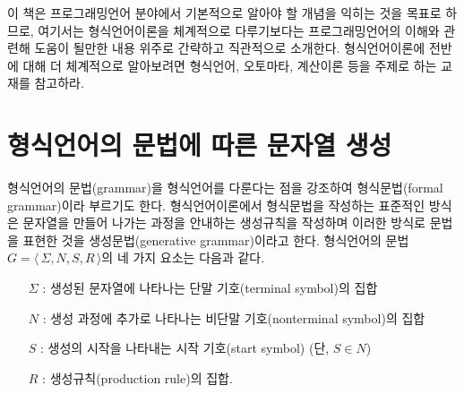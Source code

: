 이 책은 프로그래밍언어 분야에서 기본적으로 알아야 할 개념을 익히는
것을 목표로 하므로, 여기서는 형식언어이론을 체계적으로 다루기보다는
프로그래밍언어의 이해와 관련해 도움이 될만한 내용 위주로 간략하고 직관적으로 소개한다. 
형식언어이론에 전반에 대해 더 체계적으로 알아보려면 형식언어, 오토마타, 계산이론
등을 주제로 하는 교재\cite{Sipser2013,Hopcroft2007}를 참고하라.

\section{형식언어의 문법에 따른 문자열 생성}
\label{sec:GenGrammar}
%
%
%
%
형식언어의 문법(grammar)을 형식언어를 다룬다는 점을 강조하여 형식문법(formal grammar)이라
부르기도 한다. 형식언어이론에서 형식문법을 작성하는 표준적인 방식은 문자열을
만들어 나가는 과정을 안내하는 생성규칙을 작성하며 이러한 방식로 문법을
표현한 것을
%
%
%
%
생성문법(generative grammar)이라고 한다. 형식언어의 문법
$G = \langle\, \Sigma, N, S, R \,\rangle$의 네 가지 요소는 다음과 같다.\vspace{-1ex}%
%
%
%
%
%
%
%
%
%
%
%
%
%
%
%
%
\begin{itemize}\tightlist
    \item[$\Sigma$]: 생성된 문자열에 나타나는 단말 기호(terminal symbol)의 집합
    \item[$N$]: 생성 과정에 추가로 나타나는 비단말 기호(nonterminal symbol)의 집합
    \item[$S$]: 생성의 시작을 나타내는 시작 기호(start symbol) (단, $S\in N$)
    \item[$R$]: 생성규칙(production rule)의 집합.
\end{itemize}

